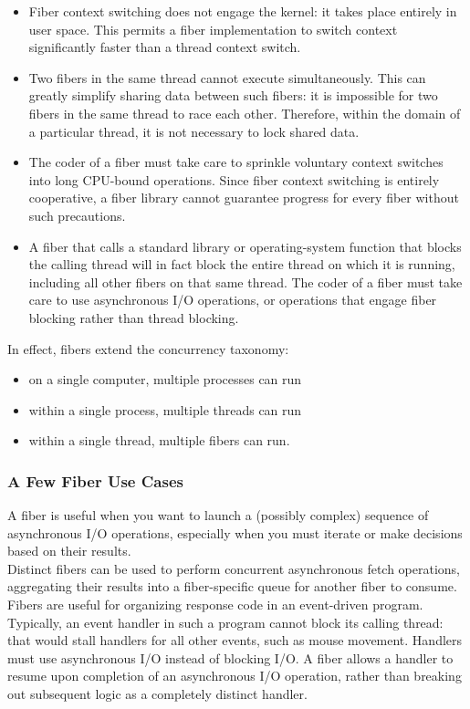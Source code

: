 \begin{itemize}
    \item Fiber context switching does not engage the kernel: it takes place entirely
          in user space. This permits a fiber implementation to switch context
          significantly faster than a thread context switch.
    \item Two fibers in the same thread cannot execute simultaneously. This can
          greatly simplify sharing data between such fibers: it is impossible for two
          fibers in the same thread to race each other. Therefore, within the domain
          of a particular thread, it is not necessary to lock shared data.
    \item The coder of a fiber must take care to sprinkle voluntary context switches
          into long CPU-bound operations. Since fiber context switching is entirely
          cooperative, a fiber library cannot guarantee progress for every fiber
          without such precautions.
    \item A fiber that calls a standard library or operating-system function that
          blocks the calling thread will in fact block the entire thread on which it
          is running, including all other fibers on that same thread. The coder of a
          fiber must take care to use asynchronous I/O operations, or operations that
          engage fiber blocking rather than thread blocking.
\end{itemize}

In effect, fibers extend the concurrency taxonomy:
\begin{itemize}
    \item on a single computer, multiple processes can run
    \item within a single process, multiple threads can run
    \item within a single thread, multiple fibers can run.
\end{itemize}

\subsubsection*{A Few Fiber Use Cases}
A fiber is useful when you want to launch a (possibly complex) sequence of
asynchronous I/O operations, especially when you must iterate or make
decisions based on their results.\\
\newline
Distinct fibers can be used to perform concurrent asynchronous fetch
operations, aggregating their results into a fiber-specific queue for another
fiber to consume.\\
\newline
Fibers are useful for organizing response code in an event-driven program.
Typically, an event handler in such a program cannot block its calling thread:
that would stall handlers for all other events, such as mouse movement.
Handlers must use asynchronous I/O instead of blocking I/O. A fiber allows a
handler to resume upon completion of an asynchronous I/O operation, rather
than breaking out subsequent logic as a completely distinct handler.\\
